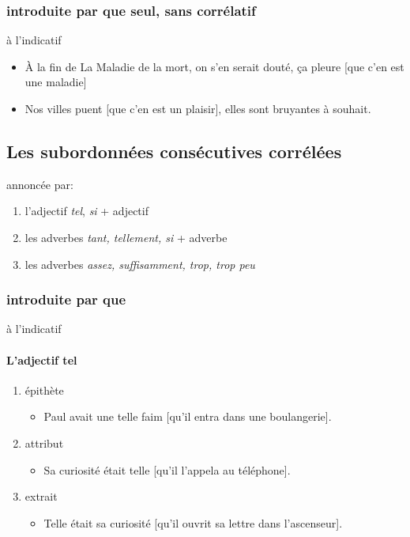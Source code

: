 \documentclass[UTF8]{report}
\begin{document}
\subsubsection{introduite par que seul, sans corrélatif}
à l’indicatif
\begin{itemize}
    \item À la fin de La Maladie de la mort, on s’en serait douté, ça pleure [que c’en est une maladie]
    \item Nos villes puent [que c’en est un plaisir], elles sont bruyantes à souhait.
\end{itemize}

\subsection{Les subordonnées consécutives corrélées}
annoncée par: 
\begin{enumerate}
    \item l’adjectif \textit{tel}, \textit{si} + adjectif
    \item les adverbes \textit{tant, tellement, si} + adverbe
    \item les adverbes \textit{assez, suffisamment, trop, trop peu}
\end{enumerate}


\subsubsection{introduite par que}
à l’indicatif
\paragraph{L’adjectif tel}
\begin{enumerate}
    \item épithète
    \begin{itemize}
        \item Paul avait une telle faim [qu’il entra dans une boulangerie].
    \end{itemize}
    \item attribut
    \begin{itemize}
        \item Sa curiosité était telle [qu’il l’appela au téléphone].
    \end{itemize}
    \item extrait
    \begin{itemize}
        \item Telle était sa curiosité [qu’il ouvrit sa lettre dans l’ascenseur].
    \end{itemize}
\end{enumerate}
\end{document}
